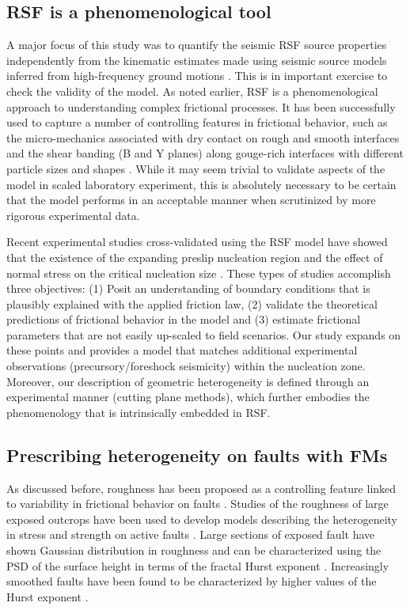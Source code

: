 \documentclass[preprint,1p, 10pt,authoryear]{elsarticle}
\begin{document}
\subsection{RSF is a phenomenological tool}
A major focus of this study was to quantify the seismic RSF source properties independently from the kinematic estimates made using seismic source models inferred from high-frequency ground motions \citep{Selvadurai2019}. This is in important exercise to check the validity of the model. As noted earlier, RSF is a phenomenological approach to understanding complex frictional processes.  It has been successfully used to capture a number of controlling features in frictional behavior, such as the micro-mechanics associated with dry contact on rough and smooth interfaces \citep{Marone1998,Yoshioka1997} and the shear banding (B and Y planes) along gouge-rich interfaces with different particle sizes and shapes \citep{Marone1993, Anthony2005,Scuderi2017}. While it may seem trivial to validate aspects of the model in scaled laboratory experiment, this is absolutely necessary to be certain that the model performs in an acceptable manner when scrutinized by more rigorous experimental data.

Recent experimental studies cross-validated using the RSF model have showed that the existence of the expanding preslip nucleation region  \citep{Nielsen2010,Kaneko2011} and the effect of normal stress on the critical nucleation size \citep{Latour2013,Kaneko2016}. These types of studies accomplish three objectives: (1) Posit an understanding of boundary conditions that is plausibly explained with the applied friction law, (2) validate the theoretical predictions of frictional behavior in the model \citep{Ruina1983,Rubin2005,Ampuero2008} and (3) estimate frictional parameters that are not easily up-scaled to field scenarios. Our study expands on these points and provides a model that matches additional experimental observations (precursory/foreshock seismicity) within the nucleation zone. Moreover, our description of geometric heterogeneity is defined through an experimental manner (cutting plane methods), which further embodies the phenomenology that is intrinsically embedded in RSF.

\subsection{Prescribing heterogeneity on faults with FMs }
As discussed before, roughness has been proposed as a controlling feature linked to variability in frictional behavior on faults \citep{Scholz1986,Scholz2002}. Studies of the roughness of large exposed outcrops have been used to develop models describing the heterogeneity in stress and strength on active faults \citep[e.g.,][]{Schmittbuhl2006}. Large sections of exposed fault have shown Gaussian distribution in roughness \citep[e.g.,][]{Renard2006} and can be characterized using the PSD of the surface height in terms of the fractal Hurst exponent \citep{Power1991, Schmittbuhl1995, Candela2009}. Increasingly smoothed faults have been found to be characterized by higher values of the Hurst exponent \citep{Brodsky2011, Siman-Tov2013, Kirkpatrick2014, Candela2016, Brodsky2016}. 
\end{document}
